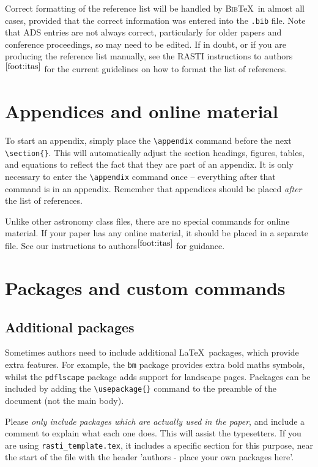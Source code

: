 \documentclass[fleqn,usenatbib,useAMS]{rasti}
\newcommand{\bibtex}{\textsc{Bib}\!\TeX} %
\begin{document}
Correct formatting of the reference list will be handled by \bibtex\ in almost all cases, provided that the correct information was entered into the \verb'.bib' file.
Note that ADS entries are not always correct, particularly for older papers and conference proceedings, so may need to be edited.
If in doubt, or if you are producing the reference list manually, see the RASTI instructions to authors$^{\ref{foot:itas}}$ for the current guidelines on how to format the list of references.

\section{Appendices and online material}

To start an appendix, simply place the \verb'\appendix' command before the next \verb'\section{}'.
This will automatically adjust the section headings, figures, tables, and equations to reflect the fact that they are part of an appendix.
It is only necessary to enter the \verb'\appendix' command once -- everything after that command is in an appendix.
Remember that appendices should be placed \textit{after} the list of references.

Unlike other astronomy class files, there are no special commands for online material.
If your paper has any online material, it should be placed in a separate file.
See our instructions to authors$^{\ref{foot:itas}}$ for guidance.

\section{Packages and custom commands}
\label{sec:packages}
\subsection{Additional packages}

Sometimes authors need to include additional \LaTeX\ packages, which provide extra features.
For example, the \verb'bm' package provides extra bold maths symbols, whilst the \verb'pdflscape' package adds support for landscape pages.
Packages can be included by adding the \verb'\usepackage{}' command to the preamble of the document (not the main body).

Please \emph{only include packages which are actually used in the paper}, and include a comment to explain what each one does.
This will assist the typesetters.
If you are using \texttt{rasti\_template.tex}, it includes a specific section for this purpose, near the start of the file with the header 'authors - place your own packages here'.
\end{document}
